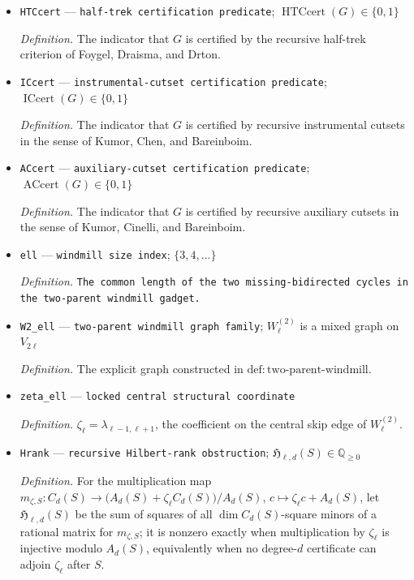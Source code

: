 \documentclass{article}
\begin{document}
\begin{itemize}
  \item \texttt{HTCcert} --- \texttt{half-\allowbreak{}trek certification predicate}; \(\operatorname{HTCcert}(G)\in\{0,1\}\)
  \par\smallskip\noindent\emph{Definition.} The indicator that \(G\) is certified by the recursive half-trek criterion of Foygel, Draisma, and Drton.
  \item \texttt{ICcert} --- \texttt{instrumental-\allowbreak{}cutset certification predicate}; \(\operatorname{ICcert}(G)\in\{0,1\}\)
  \par\smallskip\noindent\emph{Definition.} The indicator that \(G\) is certified by recursive instrumental cutsets in the sense of Kumor, Chen, and Bareinboim.
  \item \texttt{ACcert} --- \texttt{auxiliary-\allowbreak{}cutset certification predicate}; \(\operatorname{ACcert}(G)\in\{0,1\}\)
  \par\smallskip\noindent\emph{Definition.} The indicator that \(G\) is certified by recursive auxiliary cutsets in the sense of Kumor, Cinelli, and Bareinboim.
  \item \texttt{ell} --- \texttt{windmill size index}; \(\{3,4,\ldots\}\)
  \par\smallskip\noindent\emph{Definition.} \texttt{The common length of the two missing-\allowbreak{}bidirected cycles in the two-\allowbreak{}parent windmill gadget.}
  \item \texttt{W2\_\allowbreak{}ell} --- \texttt{two-\allowbreak{}parent windmill graph family}; \(W_{\ell}^{(2)}\) is a mixed graph on \(V_{2\ell}\)
  \par\smallskip\noindent\emph{Definition.} The explicit graph constructed in \(\mathrm{def:two\mbox{-}parent\mbox{-}windmill}\).
  \item \texttt{zeta\_\allowbreak{}ell} --- \texttt{locked central structural coordinate}
  \par\smallskip\noindent\emph{Definition.} \(\zeta_{\ell}=\lambda_{\ell-1,\ell+1}\), the coefficient on the central skip edge of \(W_{\ell}^{(2)}\).
  \item \texttt{Hrank} --- \texttt{recursive Hilbert-\allowbreak{}rank obstruction}; \(\mathfrak H_{\ell,d}(S)\in\mathbb Q_{\ge0}\)
  \par\smallskip\noindent\emph{Definition.} For the multiplication map \(m_{\zeta,S}:C_d(S)\to\bigl(A_d(S)+\zeta_{\ell}C_d(S)\bigr)/A_d(S)\), \(c\mapsto\zeta_{\ell}c+A_d(S)\), let \(\mathfrak H_{\ell,d}(S)\) be the sum of squares of all \(\dim C_d(S)\)-square minors of a rational matrix for \(m_{\zeta,S}\); it is nonzero exactly when multiplication by \(\zeta_{\ell}\) is injective modulo \(A_d(S)\), equivalently when no degree-\(d\) certificate can adjoin \(\zeta_{\ell}\) after \(S\).

\end{itemize}
\end{document}
